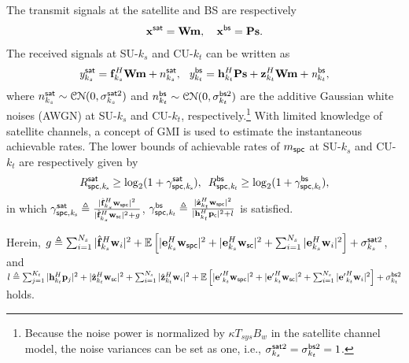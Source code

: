 \documentclass[draftclsnofoot, onecolumn, comsoc, 12pt]{IEEEtran}
\begin{document}
The transmit signals at the satellite and BS are respectively
\begin{align}
\label{eq:Tx}
    \mathbf{x}^{\sf{sat}} = \mathbf{W}\mathbf{m}, \quad
    \mathbf{x}^{\sf{bs}} = \mathbf{P}\mathbf{s}.
\end{align}
The received signals at SU-$k_{s}$ and CU-$k_{t}$ can be written as
\begin{align}
\label{eq:Rx}
    \mathit{y}_{k_{s}}^{\sf{sat}} = \mathbf{f}_{k_{s}}^{H}\mathbf{W}\mathbf{m} + {n}_{k_{s}}^{\sf{sat}}, \!\!
    \quad
\mathit{y}_{k_{t}}^{\sf{bs}} = \mathbf{h}_{k_{t}}^{H} \mathbf{P}\mathbf{s} +\mathbf{z}_{k_{t}}^{H} \mathbf{W}\mathbf{m} + \mathit{n}_{k_{t}}^{\sf{bs}},
\end{align}
where $n_{k_{s}}^{\sf{sat}}\sim \mathcal{CN}(0,{\sigma_{k_{s}}^{\sf{sat} \rm{2}}})$ and $n_{k_{t}}^{\sf{bs}}\sim \mathcal{CN}(0,{\sigma_{k_{t}}^{\sf{bs} \rm{2}}})$ are the additive Gaussian white noises (AWGN) at SU-$k_{s}$ and CU-$k_{t}$, respectively.\footnote{Because the noise power is normalized by $\kappa T_{sys} B_{w}$ in the satellite channel model, the noise variances can be set as one, i.e., ${\sigma_{k_{s}}^{\sf{sat} \rm{2}}} = {\sigma_{k_{t}}^{\sf{bs} \rm{2}}} = 1$.} 
With limited knowledge of satellite channels, a concept of GMI is used to estimate the instantaneous achievable rates. 
The lower bounds of achievable rates of $m_{\sf{spc}}$ at SU-$k_{s}$ and CU-$k_{t}$ are respectively given by 
\begin{align}
\label{eq:GMI_Rate_spc_sat} 
    R_{\sf{spc}, \it{k_{s}}}^{\sf{sat}} \geq \mathrm{log}_{2}(1+\gamma_{\sf{spc}, \it{k_{s}}}^{\sf{sat}}), \!\!\!\quad
    R_{\sf{spc}, \it{k_{t}}}^{\sf{bs}} \geq \mathrm{log}_{2}(1+ \gamma_{\sf{spc}, \it{k_{t}}}^{\sf{bs}}),
\end{align}
in which $\gamma_{{\sf spc}, \it{k_{s}}}^{\sf{sat}} \triangleq \frac{|\hat{\mathbf{f}}_{k_{s}}^{H}\mathbf{w}_{\sf{spc}}|^{2}}{|\hat{\mathbf{f}}_{k_{s}}^{H}\mathbf{w}_{\sf{sc}}|^{2} + g}$, $\gamma_{\sf{spc}, \it{k_{t}}}^{\sf{bs}} \triangleq \frac{|\hat{\mathbf{z}}_{k_{t}}^{H} \mathbf{w}_{\sf{spc}}|^{2}} {|{\mathbf{h}}_{k_{t}}^{H} \mathbf{p}_{\sf{c}}|^{2} + l}$ is satisfied. 

Herein, $g \triangleq \sum_{i=1}^{N_{s}}|\hat{\mathbf{f}}_{k_{s}}^{H} \mathbf{w}_{i}|^{2} +\mathbb{E}\left[|\mathbf{e}_{k_{s}}^{H}\mathbf{w}_{\sf{spc}}|^{2} + |\mathbf{e}_{k_{s}}^{H}\mathbf{w}_{\sf{sc}}|^{2} + \sum_{i=1}^{N_{s}}|\mathbf{e}_{k_{s}}^{H}\mathbf{w}_{i}|^{2}\right] + \sigma_{k_{s}}^{\sf{sat} \rm{2}}$, and 
$l \triangleq \sum_{j=1}^{K_{t}}|\mathbf{h}_{k_{t}}^{H} \mathbf{p}_{j}|^{2} + |\hat{\mathbf{z}}_{k_{t}}^{H} \mathbf{w}_{\sf{sc}}|^{2}
+\sum_{i=1}^{N_{s}}|\hat{\mathbf{z}}_{k_{t}}^{H}\mathbf{w}_{i}|^{2} + \mathbb{E}\left[|\mathbf{e'}_{k_{t}}^{H}\mathbf{w}_{\sf{spc}}|^{2} + |\mathbf{e'}_{k_{t}}^{H}\mathbf{w}_{\sf{sc}}|^{2} + \sum_{i=1}^{N_{s}}|\mathbf{e'}_{k_{t}}^{H}\mathbf{w}_{i}|^{2}\right] + \sigma_{k_{t}}^{\sf{bs} \rm{2}}$ holds.
\end{document}
